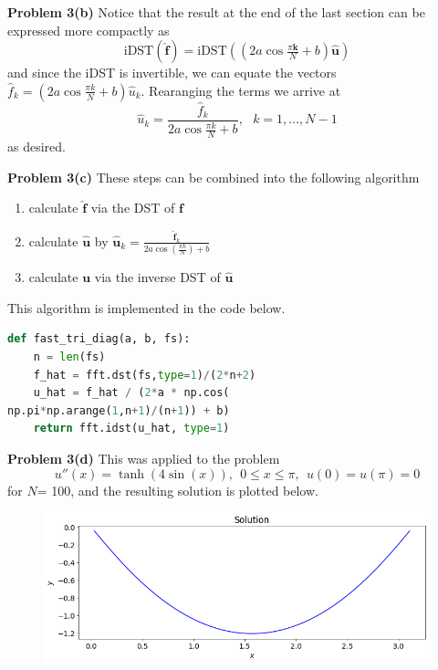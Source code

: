 \documentclass[12pt]{article}
\newcommand{\problem}[1]{\hspace{-4 ex} \large \textbf{Problem #1} }
\renewcommand{\vec}[1]{\boldsymbol{\mathbf{#1}}}
\begin{document}
\bigbreak

\problem{3(b)} Notice that the result at the end of the last section can be expressed more compactly as
$$
\text{iDST}(\hat{\vec{f}}) = \text{iDST}\left( \left(2a\cos \tfrac{\pi \vec{k}}{N} +b\right) \hat{\vec{u}} \right)
$$
and since the iDST is invertible, we can equate the vectors $\hat{f}_k = \left(2a\cos \tfrac{\pi k}{N} +b\right) \hat{u}_k$. Rearanging the terms we arrive at
$$
\hat{u}_k = \frac{\hat{f}_k}{2a\cos \tfrac{\pi k}{N} +b}, \ \ \ k=1,\dots, N-1
$$
as desired.

\bigbreak
\problem{3(c)} These steps can be combined into the following algorithm
\begin{enumerate}
	\item calculate $\hat{\vec{f}}$ via the DST of $\vec{f}$
	\item calculate $\hat{\vec{u}}$ by $\hat{\vec{u}}_k = \frac{\hat{\vec{f}}_k}{2a \cos \left(\frac{\pi k}{N} \right) + b}$
	\item calculate $\vec{u}$ via the inverse DST of $\hat{\vec{u}}$
\end{enumerate}
This algorithm is implemented in the code below.
\begin{lstlisting}[language=Python]
def fast_tri_diag(a, b, fs):
	n = len(fs)
	f_hat = fft.dst(fs,type=1)/(2*n+2)
	u_hat = f_hat / (2*a * np.cos(
np.pi*np.arange(1,n+1)/(n+1)) + b)
	return fft.idst(u_hat, type=1)
\end{lstlisting}

\bigbreak

\problem{3(d)} This was applied to the problem
$$
u''(x) = \tanh(4\sin(x)), \ \ 0 \leq x \leq \pi, \ \  u(0)=u(\pi) = 0
$$
for $N$= 100, and the resulting solution is plotted below.
\begin{figure}[H]
	\includegraphics[width=1\textwidth]{hw02_p3d_plot}
	\centering
\end{figure}
\end{document}
